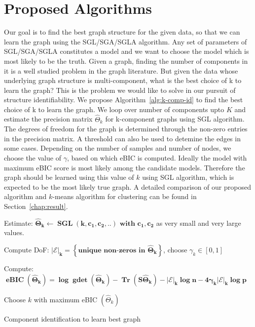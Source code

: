 \section{Proposed Algorithms}
Our goal is to find the best graph structure for the given data, so that we can learn the graph using the SGL/SGA/SGLA algorithm. Any set of parameters of SGL/SGA/SGLA constitutes a model and we want to choose the model which is most likely to be the truth. Given a graph, finding the number of components in it is a well studied problem in the graph literature. But given the data whose underlying graph structure is multi-component, what is the best choice of k to learn the graph? This is the problem we would like to solve in our pursuit of structure identifiability. We propose Algorithm~\ref{alg:k-comp-id} to find the best choice of k to learn the graph. We loop over number of components upto $K$ and estimate the precision matrix $\hat{\Theta}_{k} $ for k-component graphs using SGL algorithm. The degrees of freedom for the graph is determined through the non-zero entries in the precision matrix. A threshold can also be used to detemine the edges in some cases. Depending on the number of samples and number of nodes, we choose the value of $\gamma$, based on which eBIC is computed. Ideally the model with maximum eBIC score is most likely among the candidate models. Therefore the graph should be learned using this value of $k$ using SGL algorithm, which is expected to be the most likely true graph. A detailed comparison of our proposed algorithm and $k$-means algorithm for clustering can be found in Section~\ref{chap:result}.

\begin{algorithm}[ht]
	{
		Estimate: $\mathbf{\hat{\Theta}_{k} \leftarrow \operatorname{SGL}\left(k, c_{1}, c_{2}, . .\right) \text{ with } c_{1}, c_{2}}$ as very small and very large values.

		Compute DoF: $\mathbf{|\mathcal{E}|_{k} = \left\{ \text{unique non-zeros in } \hat{\Theta}_{k} \right\}   } $, choose $\gamma_{k} \in[0,1]$ 		
		
		Compute: $\mathbf{\operatorname{eBIC}\left(\hat{\Theta}_{k}\right)=\log \operatorname{gdet}\left(\hat{\Theta}_{k}\right)-\operatorname{Tr}\left(S \hat{\Theta}_{k}\right)-|\mathcal{E}|_{k} \log n-4 \gamma_{k} |\mathcal{E}|_{k} \log p}$ 
	}

	Choose $k$ with maximum eBIC $\left(\hat{\Theta}_{k}\right)$
	
	\caption{Component identification to learn best graph}
	\label{alg:k-comp-id}
\end{algorithm}

